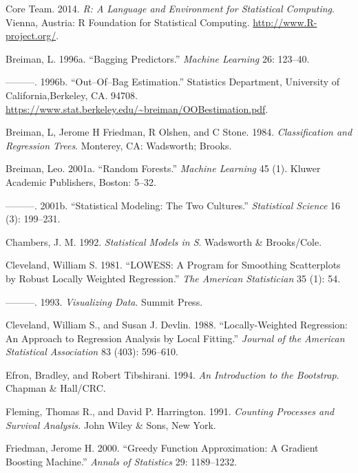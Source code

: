 \documentclass[article]{jss}
\begin{document}
{{\hypertarget{refs}{}
\hypertarget{ref-rcore}{}
 Core Team. 2014. \emph{R: A Language and Environment for
Statistical Computing}. Vienna, Austria: R Foundation for Statistical
Computing. \url{http://www.R-project.org/}.

\hypertarget{ref-Breiman:1996}{}
Breiman, L. 1996a. ``Bagging Predictors.'' \emph{Machine Learning} 26:
123--40.

\hypertarget{ref-BreimanOOB:1996e}{}
---------. 1996b. ``Out--Of--Bag Estimation.'' Statistics Department,
University of California,Berkeley, CA. 94708.
\url{https://www.stat.berkeley.edu/~breiman/OOBestimation.pdf}.

\hypertarget{ref-cart:1984}{}
Breiman, L, Jerome H Friedman, R Olshen, and C Stone. 1984.
\emph{Classification and Regression Trees}. Monterey, CA: Wadsworth;
Brooks.

\hypertarget{ref-Breiman:2001}{}
Breiman, Leo. 2001a. ``Random Forests.'' \emph{Machine Learning} 45 (1).
Kluwer Academic Publishers, Boston: 5--32.

\hypertarget{ref-Breiman:twoCultures:2001}{}
---------. 2001b. ``Statistical Modeling: The Two Cultures.''
\emph{Statistical Science} 16 (3): 199--231.

\hypertarget{ref-chambers:1992}{}
Chambers, J. M. 1992. \emph{Statistical Models in S}. Wadsworth \&
Brooks/Cole.

\hypertarget{ref-cleveland:1981}{}
Cleveland, William S. 1981. ``LOWESS: A Program for Smoothing
Scatterplots by Robust Locally Weighted Regression.'' \emph{The American
Statistician} 35 (1): 54.

\hypertarget{ref-cleveland:1993}{}
---------. 1993. \emph{Visualizing Data}. Summit Press.

\hypertarget{ref-cleveland:1988}{}
Cleveland, William S., and Susan J. Devlin. 1988. ``Locally-Weighted
Regression: An Approach to Regression Analysis by Local Fitting.''
\emph{Journal of the American Statistical Association} 83 (403):
596--610.

\hypertarget{ref-bootstrap:1994}{}
Efron, Bradley, and Robert Tibshirani. 1994. \emph{An Introduction to
the Bootstrap}. Chapman \& Hall/CRC.

\hypertarget{ref-fleming:1991}{}
Fleming, Thomas R., and David P. Harrington. 1991. \emph{Counting
Processes and Survival Analysis.} John Wiley \& Sons, New York.

\hypertarget{ref-Friedman:2000}{}
Friedman, Jerome H. 2000. ``Greedy Function Approximation: A Gradient
Boosting Machine.'' \emph{Annals of Statistics} 29: 1189--1232.

}}
\end{document}
